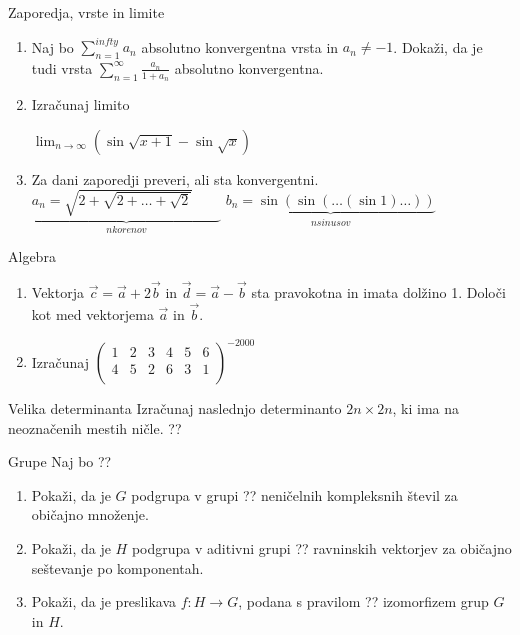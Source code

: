 \begin{frame}{Zaporedja, vrste in limite}
	\begin{enumerate}
		\item 
		Naj bo $ \sum_{n=1}^{infty}a_n $ absolutno konvergentna vrsta in $a_n \ne -1$.
		Dokaži, da je tudi vrsta $\sum_{n=1}^\infty \frac{a_n}{1+a_n}$
		absolutno konvergentna.

		\item
		Izračunaj limito
		
		\begin{centering}
		   $\lim_{n \to \infty} (\sin {\sqrt{x+1}}-\sin {\sqrt{x}})$
	    \end{centering}

		\item
		Za dani zaporedji preveri, ali sta konvergentni.
		$ \underbrace{a_n = \sqrt{2+\sqrt{2+\dots+\sqrt{2}}} \qquad}_{n korenov} $
		$ \underbrace{b_n = \sin(\sin(\dots(\sin 1)\dots))}_{n sinusov} $
		
	\end{enumerate}
\end{frame}

\begin{frame}{Algebra}
	\begin{enumerate}
		\item
		Vektorja $ \vec c=\vec a +2\vec b $ in $ \vec d=\vec a - \vec b $
		sta pravokotna in imata dolžino 1. Določi kot med vektorjema $\vec{a}$ in $\vec{b}$.
		\item 
		Izračunaj
		$ {\left( \begin{array}{cccccc} 
			1 & 2 & 3 & 4 & 5 & 6  \\
			4 & 5 & 2 & 6 & 3 & 1 \\
			\end{array} \right)}^{-2000} $
	\end{enumerate}
\end{frame}

\begin{frame}{Velika determinanta}
	Izračunaj naslednjo determinanto $2n \times 2n$, ki ima na neoznačenih mestih ničle.
	??
\end{frame}

\begin{frame}{Grupe}
	Naj bo
	??
	\begin{enumerate}
		\item
			Pokaži, da je $G$ podgrupa v grupi ??
			neničelnih kompleksnih števil za običajno množenje.
		\item
			Pokaži, da je $H$ podgrupa v aditivni grupi ??
			ravninskih vektorjev za običajno seštevanje po komponentah.
		\item
			Pokaži, da je preslikava $f:H\to G$, podana s pravilom
			??
			izomorfizem grup $G$ in $H$.
	\end{enumerate}
\end{frame}
